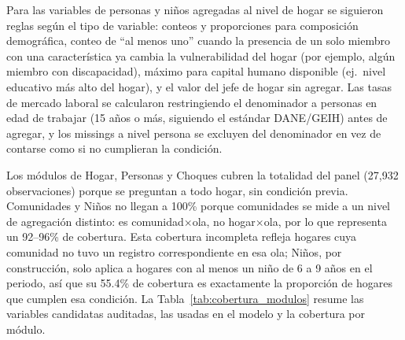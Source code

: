 \documentclass[12pt, letterpaper]{article}
\begin{document}
Para las variables de
personas y niños agregadas al nivel de hogar se siguieron reglas según el tipo de variable: conteos y proporciones para
composición demográfica, conteo de ``al menos uno'' cuando la presencia de un solo
miembro con una característica ya cambia la vulnerabilidad del hogar
(por ejemplo, algún miembro con discapacidad), máximo para capital humano
disponible (ej.\ nivel educativo más alto del hogar), y el valor del jefe de
hogar sin agregar. Las
tasas de mercado laboral se calcularon restringiendo el denominador a
personas en edad de trabajar (15 años o más, siguiendo el estándar
DANE/GEIH) antes de agregar, y los missings a nivel persona se excluyen del
denominador en vez de contarse como si no cumplieran la condición.

Los módulos de Hogar, Personas y
Choques cubren la totalidad del panel (27{,}932 observaciones) porque se
preguntan a todo hogar, sin condición previa. Comunidades y Niños no
llegan a 100\% porque comunidades se mide a un nivel de agregación distinto:
es comunidad$\times$ola, no hogar$\times$ola, por lo que representa un
92--96\% de cobertura. Esta cobertura incompleta refleja hogares cuya comunidad no
tuvo un registro correspondiente en esa ola; Niños, por
construcción, solo aplica a hogares con al menos un niño de 6 a 9 años en
el periodo, así que su 55.4\% de cobertura es exactamente la proporción
de hogares que cumplen esa condición. La Tabla~\ref{tab:cobertura_modulos}
resume las variables candidatas auditadas, las usadas en el modelo y la
cobertura por módulo.
\end{document}
